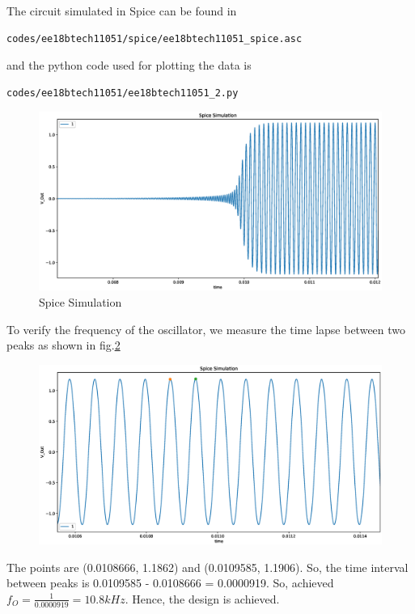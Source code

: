\begin{enumerate}[label=\arabic*.,ref=\theenumi]
The circuit simulated in Spice can be found in
\begin{lstlisting}
codes/ee18btech11051/spice/ee18btech11051_spice.asc
\end{lstlisting}
and the python code used for plotting the data is
\begin{lstlisting}
codes/ee18btech11051/ee18btech11051_2.py
\end{lstlisting}

\begin{figure}[!ht]
\centering
\includegraphics[width=\columnwidth]{./figs/ee18btech11051/ee18btech11051_plot2.eps}
\caption{Spice Simulation}
\label{fig:ee18btech11051_plot2}
\end{figure}
To verify the frequency of the oscillator, we measure the time lapse between two peaks as shown in fig.\ref{fig:ee18btech11051_plot3}
\begin{figure}[!ht]
\centering
\includegraphics[width=\columnwidth]{./figs/ee18btech11051/ee18btech11051_plot3.eps}
\caption{}
\label{fig:ee18btech11051_plot3}
\end{figure}
The points are (0.0108666, 1.1862) and (0.0109585, 1.1906). So, the time interval between peaks is 0.0109585 - 0.0108666 = 0.0000919.
So, achieved $f_{O} = \frac{1}{0.0000919} = 10.8kHz$.
Hence, the design is achieved.

\end{enumerate}
